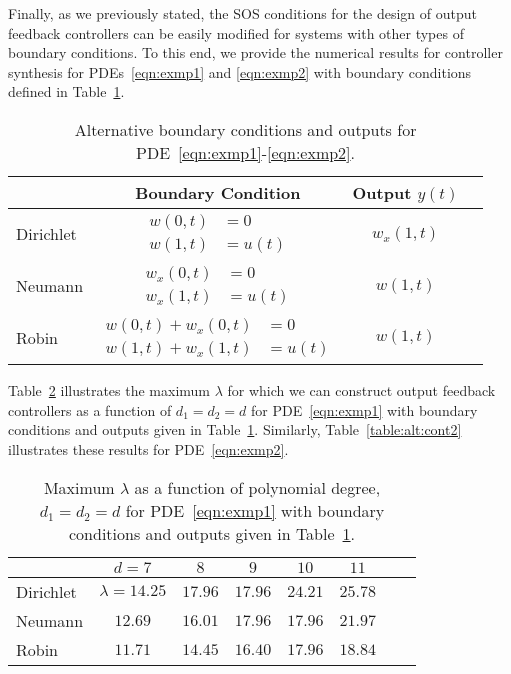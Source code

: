 \documentclass[US letter, 9 pt, conference]{ieeeconf}  \usepackage{setspace}
\begin{document}
Finally, as we previously stated, the SOS conditions for the design of output feedback controllers can be easily modified for systems with other types of boundary conditions. To this end, we provide the numerical results for controller synthesis for PDEs~\eqref{eqn:exmp1} and \eqref{eqn:exmp2} with boundary conditions defined in Table~\ref{table:alt_BC}.
\begin{table}{}
\caption{Alternative boundary conditions and outputs for PDE~\eqref{eqn:exmp1}-\eqref{eqn:exmp2}.}
\begin{center}
    \begin{tabular}{l *{3}{c}}\hline
  & Boundary Condition & Output $y(t)$  \\ \hline
   Dirichlet & {$\!\begin{aligned}
               w(0,t) &= 0 \\
               w(1,t) &= u(t) \end{aligned}$} & $w_x(1,t)$  \\ \hline
   Neumann & {$\!\begin{aligned}
               w_x(0,t) &= 0 \\
               w_x(1,t) &= u(t) \end{aligned}$} & $w(1,t)$ \\ \hline
   Robin & {$\!\begin{aligned}
               w(0,t)+w_x(0,t) &= 0 \\
               w(1,t)+w_x(1,t) &= u(t) \end{aligned}$} & $w(1,t)$
\end{tabular}
\end{center}
\label{table:alt_BC}
\end{table}
Table~\ref{table:alt:cont1} illustrates the maximum $\lambda$ for which we can construct output feedback controllers as a function of $d_1=d_2=d$ for PDE~\eqref{eqn:exmp1} with boundary conditions and outputs given in Table~\ref{table:alt_BC}. Similarly, Table~\ref{table:alt:cont2} illustrates these results for PDE~\eqref{eqn:exmp2}.

\begin{table}{}
\caption{Maximum $\lambda$ as a function of polynomial degree, $d_1=d_2=d$ for PDE~\eqref{eqn:exmp1} with boundary conditions and outputs given in Table~\ref{table:alt_BC}.}
\begin{center}
    \begin{tabular}{l *{7}{c}}\hline
  &$d=7$ & $8$ & $9$ & $10$ & $11$  \\ \hline
  Dirichlet & $\lambda=14.25$ & $17.96$ & $17.96$ & $24.21$ & $25.78$   \\
  Neumann & $12.69$ & $16.01$ & $17.96$ & $17.96$ & $21.97$ \\
  Robin & $11.71$ & $14.45$ & $16.40$ & $17.96$ & $18.84$ \\
\end{tabular}
\end{center}
\label{table:alt:cont1}
\end{table}
\end{document}
